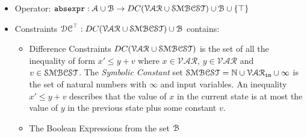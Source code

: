 \begin{itemize}
\item Operator: $\mathtt{abs}{\mathtt{expr}} : \mathcal{A} \cup \mathcal{B} \to DC(\mathcal{VAR}  \cup \mathcal{SMBCST})\cup \mathcal{B} \cup \{\top\}$
%
\item Constraints $\mathcal{DC}^{\top}: DC(\mathcal{VAR}  \cup \mathcal{SMBCST}) \cup \mathcal{B}$  contains:
%
\begin{itemize}
\item Difference Constraints $DC(\mathcal{VAR}  \cup \mathcal{SMBCST})$ is the set of all the inequality of
form $x' \leq y + v$ where $x \in \mathcal{VAR} $, 
$y \in \mathcal{VAR}$ and $v \in \mathcal{SMBCST}$.
The \emph{Symbolic Constant} set $\mathcal{SMBCST} = \mathbb{N} \cup \mathcal{VAR}_{\mathtt{in}} \cup{\infty}$
is the set of natural numbers with $\infty$ and input variables.
An inequality $x' \leq y + v$ describes that the value of $x$ in the current state is
at most the value of $y$ in the previous state plus some constant $v$.
%
\item The Boolean Expressions from the set $\mathcal{B}$
%
\end{itemize}
\end{itemize}

